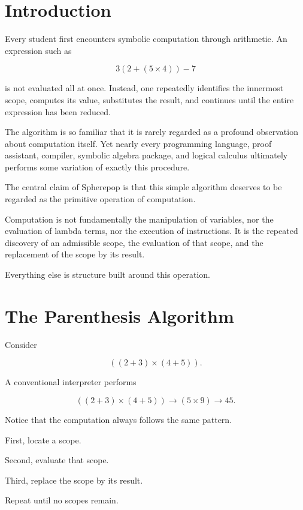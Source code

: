 \documentclass[12pt,oneside]{article}
\theoremstyle{definition}
\theoremstyle{remark}
\begin{document}
\newpage

\tableofcontents

\newpage

\section{Introduction}

Every student first encounters symbolic computation through arithmetic.
An expression such as

\[
3(2+(5\times4))-7
\]

is not evaluated all at once.
Instead, one repeatedly identifies the innermost scope,
computes its value,
substitutes the result,
and continues until the entire expression has been reduced.

The algorithm is so familiar that it is rarely regarded as a profound
observation about computation itself.
Yet nearly every programming language, proof assistant, compiler,
symbolic algebra package, and logical calculus ultimately performs
some variation of exactly this procedure.

The central claim of Spherepop is that this simple algorithm deserves
to be regarded as the primitive operation of computation.

Computation is not fundamentally the manipulation of variables,
nor the evaluation of lambda terms,
nor the execution of instructions.
It is the repeated discovery of an admissible scope,
the evaluation of that scope,
and the replacement of the scope by its result.

Everything else is structure built around this operation.

\section{The Parenthesis Algorithm}

Consider

\[
((2+3)\times(4+5)).
\]

A conventional interpreter performs

\[
((2+3)\times(4+5))
\rightarrow
(5\times9)
\rightarrow
45.
\]

Notice that the computation always follows the same pattern.

First, locate a scope.

Second, evaluate that scope.

Third, replace the scope by its result.

Repeat until no scopes remain.
\end{document}
